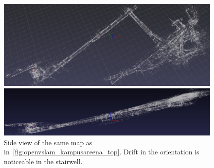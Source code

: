 \documentclass[11pt, letterpaper, twoside]{article}
\begin{document}
\begin{figure}[tb]
    \centering

    \includegraphics[width=\textwidth]{openvslam_kampusareena_top.png}
    \caption{%
        Mapping of the first and second floor of Kampusareena and the corridor
        up to the third floor of Tietotalo (223~725 points), generated with
        OpenVSLAM using as input the rectified stereo pair from the ZED camera.
        Some drift is noticeable between the two floors of Kampusareena, in the
        circular balconies. Drift is also noticeable in the long corridor and
        in the bridge between Sähkötalo and Kampusareena, but additional loop
        closures could have helped reducing it.
    }\label{fig:openvslam_kampusareena_top}

    \vspace{1em}

    \includegraphics[width=\textwidth]{openvslam_kampusareena_side.png}
    \caption{%
        Side view of the same map as in~\cref{fig:openvslam_kampusareena_top}.
        Drift in the orientation is noticeable in the stairwell.
    }\label{fig:openvslam_kampusareena_side}

    \vspace{1em}


\end{figure}
\end{document}
